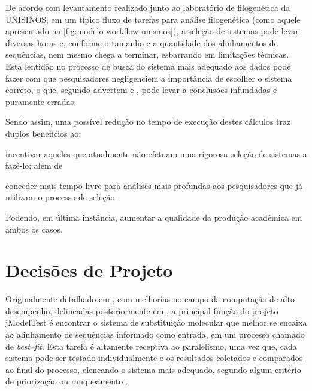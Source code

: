 \documentclass[english,brazilian]{UNISINOSmonografia} %
\begin{document}
De acordo com levantamento realizado junto ao laboratório de filogenética da UNISINOS, em um típico fluxo de tarefas para análise filogenética (como aquele apresentado na \autoref{fig:modelo-workflow-unisinos}), a seleção de sistemas pode levar diversas horas e, conforme o tamanho e a quantidade dos alinhamentos de sequências, nem mesmo chega a terminar, esbarrando em limitações técnicas.
Esta lentidão no processo de busca do sistema mais adequado aos dados pode fazer com que pesquisadores negligenciem a importância de escolher o sistema correto, o que, segundo advertem  e , pode levar a conclusões infundadas e puramente erradas.


Sendo assim, uma possível redução no tempo de execução destes cálculos traz duplos benefícios ao: 
\begin{inparaenum} 
	\item incentivar aqueles que atualmente não efetuam uma rigorosa seleção de sistemas a fazê-lo; além de 
	\item conceder mais tempo livre para análises mais profundas aos pesquisadores que já utilizam o processo de seleção.
\end{inparaenum}
Podendo, em última instância, aumentar a qualidade da produção acadêmica em ambos os casos.


\section{Decisões de Projeto}
\label{sec:modelo-decisoes}




Originalmente detalhado em , com melhorias no campo da computação de alto desempenho, delineadas posteriormente em , a principal função do projeto jModelTest é encontrar o sistema de substituição molecular que melhor se encaixa ao alinhamento de sequências informado como entrada, em um processo chamado de \textit{best--fit}.
Esta tarefa é altamente receptiva ao paralelismo, uma vez que, cada sistema pode ser testado individualmente e os resultados coletados e comparados ao final do processo, elencando o sistema mais adequado, segundo algum critério de priorização ou ranqueamento \cite{Keane2006a}.
\end{document}
